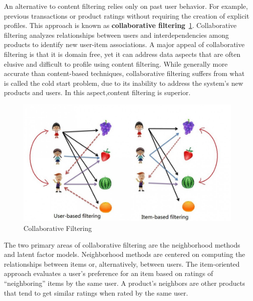 \documentclass{article}
\begin{document}
An alternative to content filtering relies only on past user behavior. For example, previous transactions or product ratings without requiring the creation of explicit profiles. This approach is known as \textbf{collaborative filtering}~\ref{fig:cf}. Collaborative filtering analyzes relationships between users and interdependencies among products to identify new user-item associations. A major appeal of collaborative filtering is that it is domain free, yet it can address data aspects that are often elusive and difficult to profile using content filtering. While generally more accurate than content-based techniques, collaborative filtering suffers from what is called the cold start problem, due to its inability to address the system’s new products and users. In this aspect,content filtering is superior.

\begin{figure}[ht]
\vskip 0.2in
\begin{center}
\centerline{\includegraphics[width=\columnwidth]{collaborativeFiltering}}
\caption{Collaborative Filtering}
\label{fig:cf}
\end{center}
\vskip -0.2in
\end{figure}

The two primary areas of collaborative filtering are the neighborhood methods and latent factor models. Neighborhood methods are centered on computing the relationships between items or, alternatively, between users. The item-oriented approach evaluates a user’s preference for an item based on ratings of “neighboring” items by the same user. A product’s neighbors are other products that tend to get similar ratings when rated by the same user. 
\end{document}
